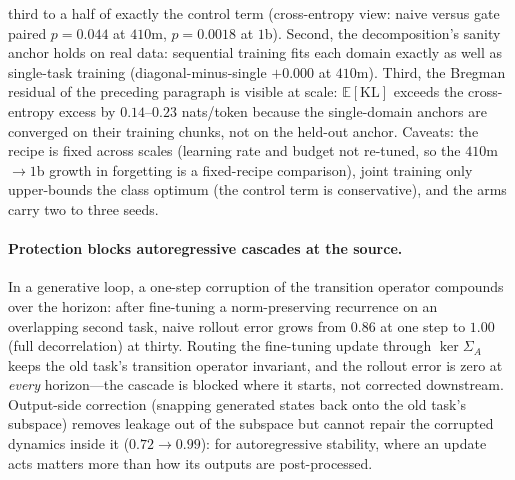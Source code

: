 \documentclass[10pt,a4paper]{article}
\theoremstyle{plain}
\theoremstyle{definition}
\newcommand{\Sig}{\Sigma}
\begin{document}
third to a half of exactly the control term (cross-entropy view: naive versus gate
paired $p=0.044$ at $410$m, $p=0.0018$ at $1$b). Second, the decomposition's sanity
anchor holds on real data: sequential training fits each domain exactly as well as
single-task training (diagonal-minus-single $+0.000$ at $410$m). Third, the
Bregman residual of the preceding paragraph is visible at scale:
$\mathbb{E}[\mathrm{KL}]$ exceeds the cross-entropy excess by $0.14$--$0.23$
nats/token because the single-domain anchors are converged on their training chunks,
not on the held-out anchor. Caveats: the recipe is fixed across scales (learning rate
and budget not re-tuned, so the $410$m$\to$$1$b growth in forgetting is a
fixed-recipe comparison), joint training only upper-bounds the class optimum (the
control term is conservative), and the arms carry two to three seeds.

\paragraph{Protection blocks autoregressive cascades at the source.} In a generative loop,
a one-step corruption of the transition operator compounds over the horizon: after
fine-tuning a norm-preserving recurrence on an overlapping second task, naive rollout error
grows from $0.86$ at one step to $1.00$ (full decorrelation) at thirty. Routing the
fine-tuning update through $\ker\Sig_A$ keeps the old task's transition operator invariant,
and the rollout error is zero at \emph{every} horizon---the cascade is blocked where it
starts, not corrected downstream. Output-side correction (snapping generated states back
onto the old task's subspace) removes leakage out of the subspace but cannot repair the
corrupted dynamics inside it ($0.72\to0.99$): for autoregressive stability, where an update
acts matters more than how its outputs are post-processed.
\end{document}
